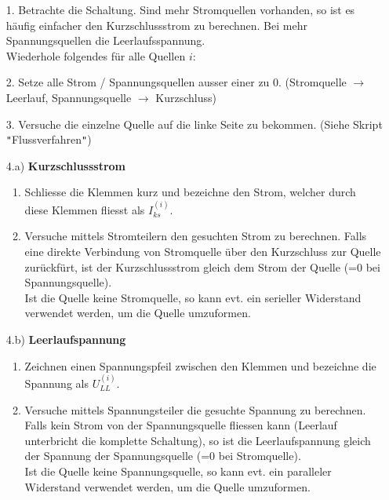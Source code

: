 																				\newpage
																				\beginvor
																				\begin{itemize}

																				  \item[1.] Betrachte die Schaltung. Sind mehr Stromquellen vorhanden, so ist es häufig einfacher den Kurzschlussstrom zu berechnen. Bei mehr Spannungsquellen die Leerlaufsspannung. \\
																				  Wiederhole folgendes für alle Quellen $i$: \\
																				  \end{itemize}
																				  \beginip
																				  \begin{itemize}

																				  \item [2.  ]  Setze alle Strom / Spannungsquellen ausser einer zu 0. (Stromquelle $\rightarrow$ Leerlauf, Spannungsquelle $\rightarrow$ Kurzschluss)
																				  \item[3. ] Versuche die einzelne Quelle auf die linke Seite zu bekommen. (Siehe Skript \texttt{"}Flussverfahren\texttt{"})
																				  \item[4.a)] \textbf{Kurzschlussstrom}
																				  \begin{enumerate}
																				  \item Schliesse die Klemmen kurz und bezeichne den Strom, welcher durch diese Klemmen fliesst als $I_{ks}^{(i)}$.
																				  \item Versuche mittels Stromteilern den gesuchten Strom zu berechnen. Falls eine direkte Verbindung von Stromquelle über den Kurzschluss zur Quelle zurückfürt, ist der Kurzschlussstrom gleich dem Strom der Quelle (=0 bei Spannungsquelle). \\
																				  Ist die Quelle keine Stromquelle, so kann evt. ein serieller Widerstand verwendet werden, um die Quelle umzuformen.
																				  \end{enumerate}
																				  \item[4.b)] \textbf{Leerlaufspannung}
																				  \begin{enumerate}
																				  \item Zeichnen einen Spannungspfeil zwischen den Klemmen und bezeichne die Spannung als $U_{LL}^{(i)}$.
																				  \item Versuche mittels Spannungsteiler die gesuchte Spannung zu berechnen. Falls kein Strom von der Spannungsquelle fliessen kann (Leerlauf unterbricht die komplette Schaltung), so ist die Leerlaufspannung gleich der Spannung der Spannungsquelle (=0 bei Stromquelle). \\
																				  Ist die Quelle keine Spannungsquelle, so kann evt. ein paralleler Widerstand verwendet werden, um die Quelle umzuformen.
																				  \end{enumerate}
																				\end{itemize}

